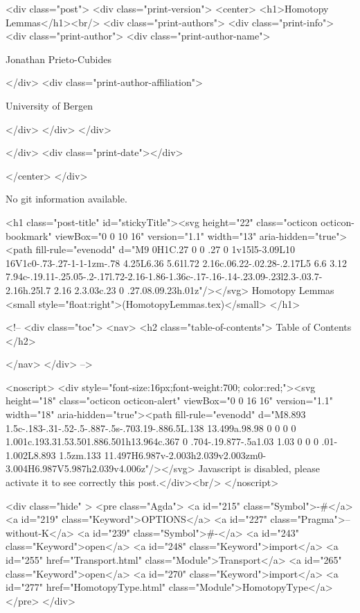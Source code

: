 <div class="post">
  <div class="print-version">
    <center>
      <h1>Homotopy Lemmas</h1><br/>
        <div class="print-authors">
          <div class="print-info">
            <div class="print-author">
              <div class="print-author-name">
                
                  Jonathan Prieto-Cubides
                
              </div>
              <div class="print-author-affiliation">
                
                  University of Bergen
                
                </div>
            </div>
          </div>
          
          
        </div>
        <div class="print-date"></div>
        
        
    </center>
  </div>

  
  No git information available.
  

  <h1 class="post-title" id="stickyTitle"><svg height="22" class="octicon octicon-bookmark" viewBox="0 0 10 16" version="1.1" width="13" aria-hidden="true"><path fill-rule="evenodd" d="M9 0H1C.27 0 0 .27 0 1v15l5-3.09L10 16V1c0-.73-.27-1-1-1zm-.78 4.25L6.36 5.61l.72 2.16c.06.22-.02.28-.2.17L5 6.6 3.12 7.94c-.19.11-.25.05-.2-.17l.72-2.16-1.86-1.36c-.17-.16-.14-.23.09-.23l2.3-.03.7-2.16h.25l.7 2.16 2.3.03c.23 0 .27.08.09.23h.01z"/></svg> Homotopy Lemmas <small style="float:right">(HomotopyLemmas.tex)</small>
  </h1>

  <!-- 
  <div class="toc">
    <nav>
    <h2 class="table-of-contents"> Table of Contents </h2>
      

    </nav>
  </div>
   -->

  <noscript>
  <div style="font-size:16px;font-weight:700; color:red;"><svg height="18" class="octicon octicon-alert" viewBox="0 0 16 16" version="1.1" width="18" aria-hidden="true"><path fill-rule="evenodd" d="M8.893 1.5c-.183-.31-.52-.5-.887-.5s-.703.19-.886.5L.138 13.499a.98.98 0 0 0 0 1.001c.193.31.53.501.886.501h13.964c.367 0 .704-.19.877-.5a1.03 1.03 0 0 0 .01-1.002L8.893 1.5zm.133 11.497H6.987v-2.003h2.039v2.003zm0-3.004H6.987V5.987h2.039v4.006z"/></svg> Javascript is disabled, please activate it to see correctly this post.</div><br/>
  </noscript>

  <div class="hide" >
<pre class="Agda">
<a id="215" class="Symbol">{-#</a> <a id="219" class="Keyword">OPTIONS</a> <a id="227" class="Pragma">--without-K</a> <a id="239" class="Symbol">#-}</a>
<a id="243" class="Keyword">open</a> <a id="248" class="Keyword">import</a> <a id="255" href="Transport.html" class="Module">Transport</a>
<a id="265" class="Keyword">open</a> <a id="270" class="Keyword">import</a> <a id="277" href="HomotopyType.html" class="Module">HomotopyType</a>
</pre>
</div>


